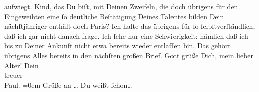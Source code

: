 \begin{ledgroupsized}[t]{13cm}
               aufwiegt. Kind, das Du biſt, mit Deinen Zweifeln, die doch übrigens für den
               Eingeweihten eine ſo deutliche Beſtätigung Deines Talentes bilden{\dotsfour}\pend
           \pstart
           {\pb}Dein nächſtjähriger \label{K_L02671-3v}\label{K_L02671-3h} enthält doch Paris? Ich
               halte das übrigens für ſo ſelbſtverſtändlich, daß ich gar nicht danach frage. Ich
               ſehe nur eine Schwierigkeit: nämlich daß ich bis zu Deiner Ankunft nicht etwa bereits
               wieder entlaſſen bin.\pend
           \pstart
           Das gehört übrigens Alles bereits in den nächſten großen Brief. Gott grüße Dich, mein
               lieber Alter!\pend
           \pstart
           Dein {\\[\baselineskip]}treuer {\\[\baselineskip]}\spacefill\mbox{Paul.}\pend
           \leftskip=0em{}\pstart
           \noindent{}Grüße an {\dots}{ } Du weißt ſchon{\dots}\pend
           
         
         \endnumbering{}\end{ledgroupsized}  \newcommand{\dateiname}{L02671}\newcommand{\titel}{Paul Goldmann an Arthur Schnitzler, 22. 11. [1891]}\newcommand{\editorInnen}{Martin Anton Müller und Laura Untner}
      